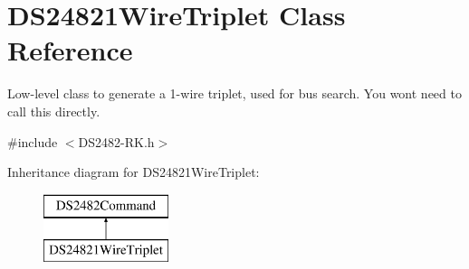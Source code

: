 \hypertarget{class_d_s24821_wire_triplet}{}\section{D\+S24821\+Wire\+Triplet Class Reference}
\label{class_d_s24821_wire_triplet}


Low-\/level class to generate a 1-\/wire triplet, used for bus search. You won\textquotesingle{}t need to call this directly.  




{\ttfamily \#include $<$D\+S2482-\/\+R\+K.\+h$>$}

Inheritance diagram for D\+S24821\+Wire\+Triplet\+:\begin{figure}[H]
\begin{center}
\leavevmode
\includegraphics[height=2.000000cm]{class_d_s24821_wire_triplet}
\end{center}
\end{figure}
